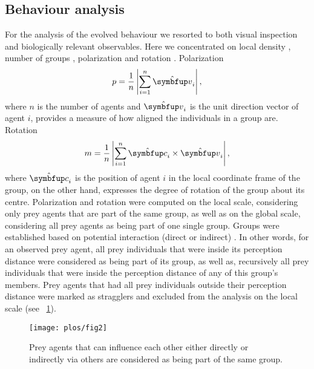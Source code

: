 \subsection{Behaviour analysis}

For the analysis of the evolved behaviour we resorted to both visual inspection \cite{kunz2006prey} and biologically relevant observables. Here we concentrated on local density \cite{huepe2008newtools}, number of groups \cite{lebarbajec2007boids,viscido2015using}, polarization and rotation \cite{couzin2002collective,tunstrom2013collective,vicsek2012collective}. Polarization
%
\begin{equation}
  p=\frac{1}{n}\left|\sum_{i=1}^{n}\uvec{v}_i\right|,
\end{equation}
%
where $n$ is the number of agents and $\uvec{v}_i$ is the unit direction vector of agent $i$, provides a measure of how aligned the individuals in a group are. Rotation
%
\begin{equation}
  m=\frac{1}{n}\left|\sum_{i=1}^{n}\uvec{c}_{i} \times \uvec{v}_i\right|,
\end{equation}
%
where $\uvec{c}_i$ is the position of agent $i$ in the local coordinate frame of the group, on the other hand, expresses the degree of rotation of the group about its centre. Polarization and rotation were computed on the local scale, \ie considering only prey agents that are part of the same group, as well as on the global scale, \ie considering all prey agents as being part of one single group. Groups were established based on potential interaction (direct or indirect) \cite{lebarbajec2007boids,viscido2015using}. In other words, for an observed prey agent, all prey individuals that were inside its perception distance were considered as being part of its group, as well as, recursively all prey individuals that were inside the perception distance of any of this group's members. Prey agents that had all prey individuals outside their perception distance were marked as stragglers and excluded from the analysis on the local scale (see \figurename~\ref{fig2}).

\begin{figure}
  \texttt{[image: plos/fig2]}
  \caption{Prey agents that can influence each other either directly or indirectly via others are considered as being part of the same group.}
  \label{fig2}
\end{figure}

